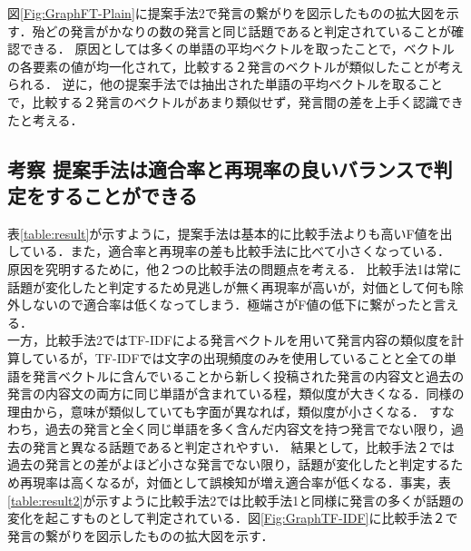 図\ref{Fig:GraphFT-Plain}に提案手法2で発言の繋がりを図示したものの拡大図を示す．殆どの発言がかなりの数の発言と同じ話題であると判定されていることが確認できる．
原因としては多くの単語の平均ベクトルを取ったことで，ベクトルの各要素の値が均一化されて，比較する２発言のベクトルが類似したことが考えられる．
逆に，他の提案手法では抽出された単語の平均ベクトルを取ることで，比較する２発言のベクトルがあまり類似せず，発言間の差を上手く認識できたと考える．

\subsection*{考察 提案手法は適合率と再現率の良いバランスで判定をすることができる}
表\ref{table:result}が示すように，提案手法は基本的に比較手法よりも高いF値を出している．また，適合率と再現率の差も比較手法に比べて小さくなっている．
原因を究明するために，他２つの比較手法の問題点を考える．
比較手法1は常に話題が変化したと判定するため見逃しが無く再現率が高いが，対価として何も除外しないので適合率は低くなってしまう．極端さがF値の低下に繋がったと言える．\\
一方，比較手法2ではTF-IDFによる発言ベクトルを用いて発言内容の類似度を計算しているが，TF-IDFでは文字の出現頻度のみを使用していることと全ての単語を発言ベクトルに含んでいることから新しく投稿された発言の内容文と過去の発言の内容文の両方に同じ単語が含まれている程，類似度が大きくなる．同様の理由から，意味が類似していても字面が異なれば，類似度が小さくなる．
すなわち，過去の発言と全く同じ単語を多く含んだ内容文を持つ発言でない限り，過去の発言と異なる話題であると判定されやすい．
結果として，比較手法２では過去の発言との差がよほど小さな発言でない限り，話題が変化したと判定するため再現率は高くなるが，対価として誤検知が増え適合率が低くなる．事実，表\ref{table:result2}が示すように比較手法2では比較手法1と同様に発言の多くが話題の変化を起こすものとして判定されている．図\ref{Fig:GraphTF-IDF}に比較手法２で発言の繋がりを図示したものの拡大図を示す．\\
